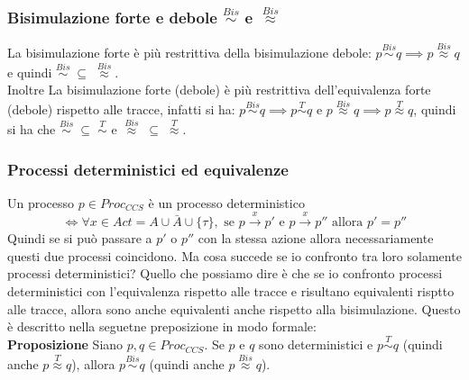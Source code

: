 \subsubsection{Bisimulazione forte e debole \texorpdfstring{$\stackrel{Bis}{\sim}$ e  $\stackrel{Bis}{\approx}$}{}}
La bisimulazione forte è più restrittiva della bisimulazione debole: $p \stackrel{Bis}\sim q \implies p \stackrel{Bis}{\approx} q$ e quindi $\stackrel{Bis}\sim \; \subseteq \;  \stackrel{Bis}{\approx}$. \\
Inoltre La bisimulazione forte (debole) è più restrittiva dell’equivalenza forte (debole) rispetto alle tracce, infatti si ha:
$p \stackrel{Bis}\sim q \implies p \stackrel{T}\sim q$ e $p \stackrel{Bis}\approx q\implies p \stackrel{T}\approx q$, quindi si ha che $\stackrel{Bis}\sim \; \subseteq \; \stackrel{T}\sim$ e $\stackrel{Bis}\approx \; \subseteq \; \stackrel{T}\approx$.
\subsubsection{Processi deterministici ed equivalenze}
Un processo $p\in Proc_{CCS}$ è un processo deterministico $$\iff \forall x\in Act = A \cup \bar{A} \cup \{\tau\}, \mbox{ se } p\stackrel{x}{\rightarrow}p'\mbox{ e }p\stackrel{x}{\rightarrow}p''\mbox{ allora }p'=p''$$
Quindi se si può passare a $p'$ o $p''$ con la stessa azione allora necessariamente questi due processi coincidono. Ma cosa succede se io confronto tra loro solamente processi deterministici? Quello che possiamo dire è che se io confronto processi deterministici con l'equivalenza rispetto alle tracce e risultano equivalenti risptto alle tracce, allora sono anche equivalenti anche rispetto alla bisimulazione. Questo è descritto nella seguetne preposizione in modo formale:\\
\textbf{Proposizione}
Siano $p,q\in Proc_{CCS}$. 
Se $p$ e $q$ sono deterministici e $p \stackrel{T}{\sim} q$ (quindi anche $p \stackrel{T}{\approx} q$), allora $p \stackrel{Bis}{\sim} q$ (quindi anche $p \stackrel{Bis}{\approx} q$).

